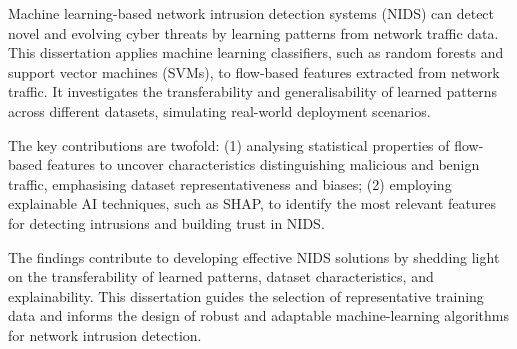 Machine learning-based network intrusion detection systems (NIDS) can detect novel and evolving cyber threats by learning patterns from network traffic data. This dissertation applies machine learning classifiers, such as random forests and support vector machines (SVMs), to flow-based features extracted from network traffic. It investigates the transferability and generalisability of learned patterns across different datasets, simulating real-world deployment scenarios.

\noindent The key contributions are twofold: (1) analysing statistical properties of flow-based features to uncover characteristics distinguishing malicious and benign traffic, emphasising dataset representativeness and biases; (2) employing explainable AI techniques, such as SHAP, to identify the most relevant features for detecting intrusions and building trust in NIDS.\@

\noindent The findings contribute to developing effective NIDS solutions by shedding light on the transferability of learned patterns, dataset characteristics, and explainability. This dissertation guides the selection of representative training data and informs the design of robust and adaptable machine-learning algorithms for network intrusion detection.